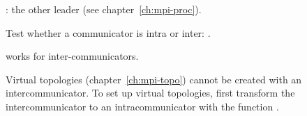 : the other leader (see chapter~\ref{ch:mpi-proc}).

Test whether a communicator is intra or inter:
.

 works for inter-communicators.


Virtual topologies (chapter~\ref{ch:mpi-topo}) cannot be created with an intercommunicator.
To set up virtual topologies, first transform the intercommunicator to an
intracommunicator with the function
.

